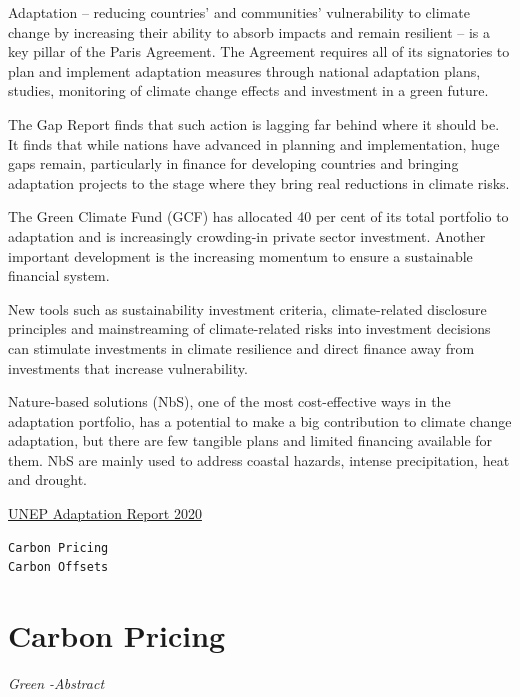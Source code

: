 \documentclass[
]{book}
\begin{document}
Adaptation -- reducing countries' and communities' vulnerability to climate change
by increasing their ability to absorb impacts and remain resilient --
is a key pillar of the Paris Agreement.
The Agreement requires all of its signatories to plan and implement adaptation measures
through national adaptation plans, studies, monitoring of climate change effects and
investment in a green future.

The Gap Report finds that such action is lagging far behind where it should be.
It finds that while nations have advanced in planning and implementation, huge gaps remain,
particularly in finance for developing countries and
bringing adaptation projects to the stage where they bring real reductions in climate risks.

The Green Climate Fund (GCF) has allocated 40 per
cent of its total portfolio to adaptation and is increasingly crowding-in private sector investment.
Another important development is the increasing momentum to ensure a sustainable financial
system.

New tools such as sustainability investment criteria, climate-related disclosure principles
and mainstreaming of climate-related risks into investment decisions can stimulate investments in
climate resilience and direct finance away from investments that increase vulnerability.

Nature-based solutions (NbS), one of the most cost-effective ways in the adaptation portfolio, has
a potential to make a big contribution to climate change adaptation, but there are few tangible
plans and limited financing available for them.
NbS are mainly used to address coastal hazards, intense precipitation, heat and
drought.

\href{https://www.unep.org/resources/adaptation-gap-report-2020}{UNEP Adaptation Report 2020}

\begin{verbatim}
Carbon Pricing
Carbon Offsets
\end{verbatim}

\hypertarget{carbon-pricing}{%
\chapter{Carbon Pricing}\label{carbon-pricing}}

\emph{Green -Abstract}
\end{document}
